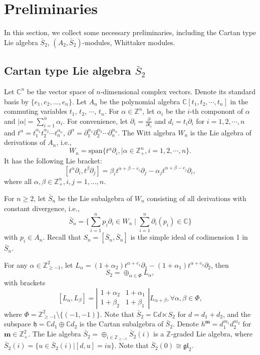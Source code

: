 \documentclass[12pt,a4paper]{amsart}
\def\Z{\mathbb{Z}}
\def\bm{\mathbf{m}}
\def\gl{\mathfrak{gl}}
\def\p{\partial}
\def\a{\alpha}
\def\be{\beta}
\begin{document}
\section{Preliminaries}

In this section, we collect some necessary preliminaries, including
the Cartan type Lie algebra $\bar{S}_2$, $(A_2, \bar{S}_2)$-modules,
Whittaker modules.

\subsection{Cartan type Lie algebra $\bar{S}_2$}

Let $\mathbb{C}^n$ be the vector space of $n$-dimensional complex vectors. Denote its standard basis by $\{e_1, e_2, ..., e_n\}$.  Let $A_n$ be the polynomial algebra  $\mathbb{C}[t_1,t_2, \cdots ,t_n]$ in the commuting variables $t_1$, $t_2$, $\cdots$, $t_n$. For $\alpha \in \mathbb{Z}^n$, let $\alpha_i$ be the $i$-th componont of $\alpha$ and $|\alpha|=\sum^{n}_{i=1}\alpha_i$. For convenience, let $\partial_i=\frac{\partial}{\partial t_i}$ and $d_i=t_i\partial_i$ for $i=1, 2, \cdots, n$ and $t^{\alpha}=t^{\alpha_1}_1t^{\alpha_2}_2\cdots t^{\alpha_n}_n$, $\partial^{\alpha}=\partial^{\alpha_1}_1 \partial^{\alpha_2}_2\cdots \partial^{\alpha_n}_n$.
The Witt algebra $W_n$ is the Lie algebra of derivations of $A_n$, i.e.,
$$W_n=\text{span}\{t^{\alpha}\partial_i,\mid \alpha \in \mathbb{Z}_+^n, i=1, 2, \cdots, n\}.$$
It  has the following Lie bracket:
$$[t^{\a}\p_{i},t^{\be}\p_{j}]=
\be_it^{\a+\be-e_i}\p_{j}
-\a_jt^{\a+\be-e_j}\p_{i},$$
where all $\a,\be\in \Z_{+}^n,i,j=1,\dots,n$.

For $n \geq 2$, let $\bar{S}_n$ be  the Lie subalgebra of $W_n$
consisting of all derivations with constant divergence, i.e.,
$$\bar{S}_n=\{\sum^{n}_{i=1}p_i \partial_i \in W_n \mid \sum^{n}_{i=1}\partial_i(p_i) \in \mathbb{C}\}$$
with $p_i \in A_n$. Recall that $S_n=[\bar{S}_n,\bar{S}_n]$ is the simple ideal of codimension 1 in $\bar{S}_n$.

For any $\alpha \in \mathbb{Z}^2_{\geq-1}$, let $L_{\alpha}=(1+\alpha_2)t^{\alpha+e_1}\partial_1-(1+\alpha_1)t^{\alpha+e_2}\partial_2$, then
$$S_2=\oplus_{\alpha \in \Phi} L_{\alpha},$$
with brackets
$$[L_{\a},L_{\be}]=\left|\begin{array}{cc}
1+\a_2& 1+\a_1\\
1+\be_2& 1+\be_1
\end{array}\right|L_{\a+\be},\forall \a,\be\in\Phi,$$
where $\Phi=\mathbb{Z}^2_{\geq-1}\setminus\{(-1,-1)\}$. Note that $\bar{S}_2=\mathbb{C}d\ltimes S_2$ for $d=d_1+d_2$,  and the subspace $\mathfrak{h}=\mathbb{C}d_1\oplus \mathbb{C}d_2$ is the Cartan subalgebra of $\bar{S}_2$. Denote $h^{\bm}=d_1^{m_1}d_2^{m_2}$ for $\bm\in\Z_+^2$.
The Lie algebra $\bar{S}_2=\oplus_{i\in \Z_{\geq -1}}\bar{S}_2(i)$ is a $\Z$-graded Lie algebra, where $\bar{S}_2(i)=\{u\in \bar{S}_2(i)|[d,u]=iu\}$.
Note that  $\bar{S}_2(0)\cong \gl_2$.
\end{document}
